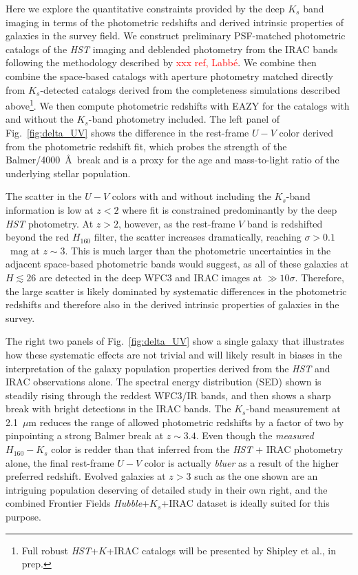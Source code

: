 \documentclass[preprint2]{aastex6}
\newcommand\XXX[1]{{\textcolor{red}{xxx #1}}}
\begin{document}
Here we explore the quantitative constraints provided by the deep $K_s$ band imaging in terms of the photometric redshifts and derived intrinsic properties of galaxies in the survey field.  We construct preliminary PSF-matched photometric catalogs of the \textit{HST} imaging and deblended photometry from the IRAC bands following the methodology described by \XXX{ref, Labb\'e}.  We combine then combine the space-based catalogs with aperture photometry matched directly from $K_s$-detected catalogs derived from the completeness simulations described above\footnote{Full robust \textit{HST}+$K$+IRAC catalogs will be presented by Shipley et al., in prep.}.  We then compute photometric redshifts with EAZY \citep{brammer:08} for the catalogs with and without the $K_s$-band photometry included.  The left panel of Fig.~\ref{fig:delta_UV} shows the difference in the rest-frame $U-V$ color derived from the photometric redshift fit, which probes the strength of the Balmer/4000~\AA\ break and is a proxy for the age and mass-to-light ratio of the underlying stellar population.  

The scatter in the $U-V$ colors with and without including the $K_s$-band information is low at $z<2$ where fit is constrained predominantly by the deep \textit{HST} photometry.  At $z>2$, however, as the rest-frame $V$ band is redshifted beyond the red $H_{160}$ filter, the scatter increases dramatically, reaching $\sigma>0.1$~mag at $z\sim3$.  This is much larger than the photometric uncertainties in the adjacent space-based photometric bands would suggest, as all of these galaxies at $H\lesssim26$ are detected in the deep WFC3 and IRAC images at $\gg10$$\sigma$.  Therefore, the large scatter is likely dominated by systematic differences in the photometric redshifts and therefore also in the derived intrinsic properties of galaxies in the survey.  

The right two panels of Fig.~\ref{fig:delta_UV} show a single galaxy that illustrates how these systematic effects are not trivial and will likely result in biases in the interpretation of the galaxy population properties derived from the \textit{HST} and IRAC observations alone.  The spectral energy distribution (SED) shown is steadily rising through the reddest WFC3/IR bands, and then shows a sharp break with bright detections in the IRAC bands.  The $K_s$-band measurement at 2.1~$\mu$m reduces the range of allowed photometric redshifts by a factor of two by pinpointing a strong Balmer break at $z\sim3.4$.  Even though the \textit{measured} $H_{160}-K_s$ color is redder than that inferred from the \textit{HST} + IRAC photometry alone, the final rest-frame $U-V$ color is actually \textit{bluer} as a result of the higher preferred redshift.  Evolved galaxies at $z>3$ such as the one shown are an intriguing population deserving of detailed study in their own right, and the combined Frontier Fields \textit{Hubble}+$K_s$+IRAC dataset is ideally suited for this purpose.
\end{document}
